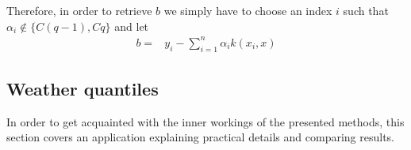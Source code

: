 Therefore, in order to retrieve $b$ we simply have to choose an index $i$ such that  $\alpha_i \not \in \{C(q-1), Cq\}$
and let
\begin{equation}
    \begin{aligned}
    b=&y_i-\sum\limits_{i=1}^n \alpha_i k(x_i,x)
    \end{aligned}
\end{equation}


\subsection{Weather quantiles}
In order to get acquainted with the inner workings of the presented methods, this section covers an application explaining practical details and comparing results.

